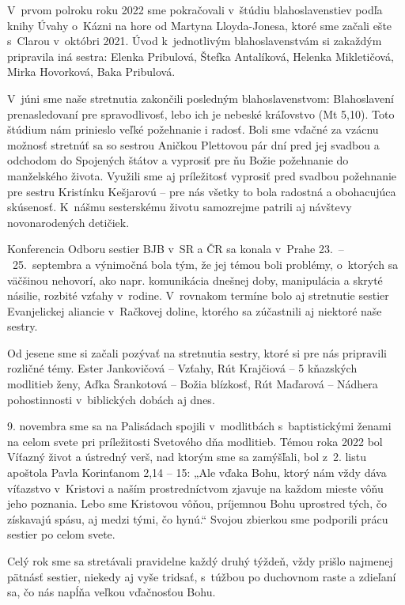 V~prvom polroku roku 2022 sme pokračovali v~štúdiu blahoslavenstiev podľa knihy Úvahy o~Kázni na hore od Martyna Lloyda-Jonesa, ktoré sme začali ešte s~Clarou v~októbri 2021. Úvod k~jednotlivým blahoslavenstvám si zakaždým pripravila iná sestra: Elenka Pribulová, Štefka Antalíková, Helenka Mikletičová, Mirka Hovorková, Baka Pribulová.

V~júni sme naše stretnutia zakončili posledným blahoslavenstvom: Blahoslavení prenasledovaní pre spravodlivosť, lebo ich je nebeské kráľovstvo (Mt 5,10). Toto štúdium nám prinieslo veľké požehnanie i radosť.
Boli sme vďačné za vzácnu možnosť stretnúť sa so sestrou Aničkou Plettovou pár dní pred jej svadbou a odchodom do Spojených štátov a vyprosiť pre ňu Božie požehnanie do manželského života. Využili sme aj príležitosť vyprosiť pred svadbou požehnanie pre sestru Kristínku Kešjarovú -- pre nás všetky to bola radostná a obohacujúca skúsenosť.
K~nášmu sesterskému životu samozrejme patrili aj návštevy novonarodených detičiek.

Konferencia Odboru sestier BJB v~SR a ČR sa konala v~Prahe 23.~--~25.~septembra a výnimočná bola tým, že jej témou boli problémy, o~ktorých sa väčšinou nehovorí, ako napr. komunikácia dnešnej doby, manipulácia a skryté násilie, rozbité vzťahy v~rodine. V~rovnakom termíne bolo aj stretnutie sestier Evanjelickej aliancie v~Račkovej doline, ktorého sa zúčastnili aj niektoré naše sestry.

Od jesene sme si začali pozývať na stretnutia sestry, ktoré si pre nás pripravili rozličné témy. Ester Jankovičová – Vzťahy, Rút Krajčiová – 5 kňazských modlitieb ženy, Aďka Šrankotová – Božia blízkosť, Rút Maďarová –  Nádhera pohostinnosti v~biblických dobách aj dnes.

9. novembra sme sa na Palisádach spojili v~modlitbách s~baptistickými ženami na celom svete pri príležitosti Svetového dňa modlitieb. Témou roka 2022 bol Víťazný život a ústredný verš, nad ktorým sme sa zamýšľali, bol z~2. listu apoštola Pavla Korinťanom 2,14 -- 15: „Ale vďaka Bohu, ktorý nám vždy dáva víťazstvo v~Kristovi a naším prostredníctvom zjavuje na každom mieste vôňu jeho poznania. Lebo sme Kristovou vôňou, príjemnou Bohu uprostred tých, čo získavajú spásu, aj medzi tými, čo hynú.“ Svojou zbierkou sme podporili prácu sestier po celom svete.

Celý rok sme sa stretávali pravidelne každý druhý týždeň, vždy prišlo najmenej pätnásť sestier, niekedy aj vyše tridsať, s~túžbou po duchovnom raste a zdieľaní sa, čo nás napĺňa veľkou vďačnosťou Bohu.

